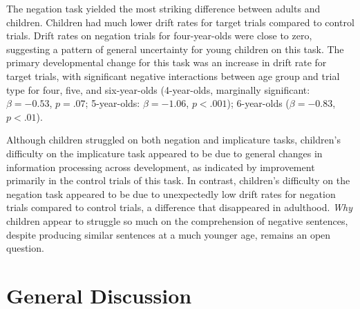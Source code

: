 \documentclass[man, noapacite]{apa2}
\newcommand{\ejy}[1]{\textcolor{Blue}{[ejy: #1]}}
\newcommand{\aen}[1]{\textcolor{DarkOrange}{[aen: #1]}}
\begin{document}
The negation task yielded the most striking difference between adults and children. Children had much lower drift rates for target trials compared to control trials. Drift rates on negation trials for four-year-olds were close to zero, suggesting a pattern of general uncertainty for young children on this task. The primary developmental change for this task was an increase in drift rate for target trials, with significant negative interactions between age group and trial type for four, five, and six-year-olds (4-year-olds, marginally significant: $\beta = -0.53$, $p = .07$; 5-year-olds: $\beta = -1.06$, $p <.001$); 6-year-olds ($\beta = -0.83$, $p < .01$).



Although children struggled on both negation and implicature tasks, children's difficulty on the implicature task appeared to be due to general changes in information processing across development, as indicated by improvement primarily in the control trials of this task. In contrast, children's difficulty on the negation task appeared to be due to unexpectedly low drift rates for negation trials compared to control trials, a difference that disappeared in adulthood. \emph{Why} children appear to struggle so much on the comprehension of negative sentences, despite producing similar sentences at a much younger age, remains an open question.


\section{General Discussion}
\end{document}
